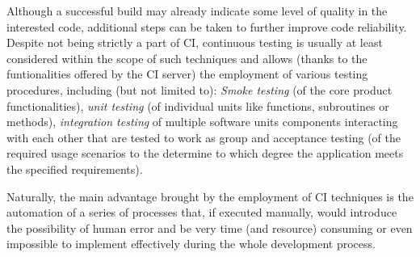 Although a successful build may already indicate some level of quality in the interested code, additional steps can be taken to further improve code reliability. Despite not being strictly a part of CI, continuous testing \cite{CT} is usually at least considered within the scope of such techniques and allows (thanks to the funtionalities offered by the CI server) the employment of various testing procedures, including (but not limited to): \textit{Smoke testing} (of the core product functionalities), \textit{unit testing} (of individual units like functions, subroutines or methods), \textit{integration testing} of multiple software units components interacting with each other that are tested to work as group and acceptance testing (of the required usage scenarios to the determine to which degree the application meets the specified requirements).

Naturally, the main advantage brought by the employment of CI techniques is the automation of a series of processes that, if executed manually, would introduce the possibility of human error and be very time (and resource) consuming or even impossible to implement effectively during the whole development process. 